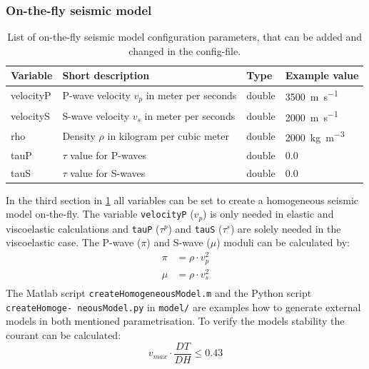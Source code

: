 \documentclass[pdftex,a4paper,parskip,listof=totoc,bibliography=totoc,onehalfspacing,12pt]{scrreprt}
\newcommand{\shellcmd}[1]{\indent\indent\texttt{#1}}	%
\begin{document}
\subsubsection{On-the-fly seismic model}
\begin{table}[h!]
\caption[List of on-the-fly seismic model configuration parameters.]{List of on-the-fly seismic model configuration parameters, that can be added and changed in the config-file.}\label{tab:config_onthefly}
\centering
\begin{adjustbox}{width=0.8\textwidth,center=\textwidth}
	\begin{tabular}{llll}
	\toprule
	Variable & Short description & Type & Example value \\
	\midrule
	velocityP & P-wave velocity $v_p$ in meter per seconds & double & \SI{3500}{m\per s} \\
	velocityS& S-wave velocity $v_s$ in meter per seconds & double  & \SI{2000}{m\per s}\\
	rho& Density $\rho$ in kilogram per cubic meter & double &  \SI{2000}{kg\per\cubic\metre}\\
	tauP& $\tau$ value for P-waves & double & \num{0.0}\\
	tauS& $\tau$ value for S-waves & double & \num{0.0}\\
	\bottomrule
	\end{tabular}
	\end{adjustbox}
\end{table}
In the third section in \ref{tab:config_onthefly} all variables can be set to create a homogeneous seismic model on-the-fly. The variable \verb+velocityP+ ($v_p$) is only needed in elastic and viscoelastic calculations and  \verb+tauP+ ($\tau^p$) and \verb+tauS+ ($\tau^s$) are solely needed in the viscoelastic case. 
The P-wave ($\pi$) and S-wave ($\mu$) moduli can be calculated by:
\begin{align*}
	\pi&=\rho\cdot v_p^2\\
	\mu &=\rho\cdot v_s^2\\
\end{align*}
The Matlab script \shellcmd{createHomogeneousModel.m} and the Python script \shellcmd{createHomoge- neousModel.py} in \shellcmd{model/} are examples how to generate external models in both mentioned parametrisation. 
To verify the models stability  the courant can be calculated: 
\begin{equation*}
	v_{max} \cdot \frac{DT}{DH} \leq 0.43
\end{equation*}
\end{document}
